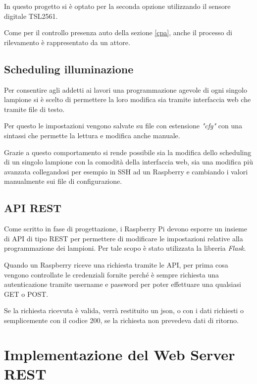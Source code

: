 In questo progetto si è optato per la seconda opzione utilizzando il sensore digitale TSL2561.

Come per il controllo presenza auto della sezione \ref{cpa}, anche il processo di rilevamento è rappresentato da un attore.


\subsection{Scheduling illuminazione \label{si}}

Per consentire agli addetti ai lavori una programmazione agevole di ogni singolo lampione si è scelto di permettere la loro modifica sia tramite interfaccia web che tramite file di testo.

Per questo le impostazioni vengono salvate su file con estensione \textit{"cfg"} con una sintassi che permette la lettura e modifica anche manuale.

Grazie a questo comportamento si rende possibile sia la modifica dello scheduling di un singolo lampione con la comodità della interfaccia web, sia una modifica più avanzata collegandosi per esempio in SSH ad un Raspberry e cambiando i valori manualmente sui file di configurazione.


\newpage

\subsection{API REST}

Come scritto in fase di progettazione, i Raspberry Pi devono esporre un insieme di API di tipo REST per permettere di modificare le impostazioni relative alla programmazione dei lampioni.
Per tale scopo è stato utilizzata la libreria \textit{Flask}.

Quando un Raspberry riceve una richiesta tramite le API, per prima cosa vengono controllate le credenziali fornite perché è sempre richiesta una autenticazione tramite username e password per poter effettuare una qualsiasi GET o POST.

Se la richiesta ricevuta è valida, verrà restituito un json, o con i dati richiesti o semplicemente con il codice 200, se la richiesta non prevedeva dati di ritorno.

\section{Implementazione del Web Server REST}

